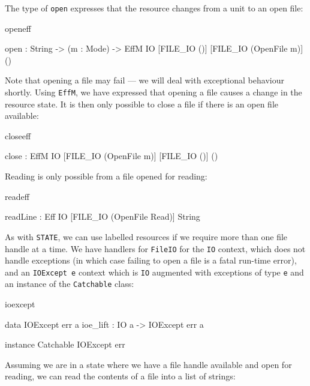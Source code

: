 \noindent
The type of \texttt{open} expresses that the resource changes from a unit
to an open file:

\begin{SaveVerbatim}{openeff}

open : String -> (m : Mode) -> 
       EffM IO [FILE_IO ()] [FILE_IO (OpenFile m)] ()

\end{SaveVerbatim}

\noindent
Note that opening a file may fail --- we will deal with exceptional behaviour
shortly. 
Using \texttt{EffM}, we have expressed that opening a file causes a change in the
resource state.
It is then only possible to close a file if there is an open file
available:

\begin{SaveVerbatim}{closeeff}

close : EffM IO [FILE_IO (OpenFile m)] [FILE_IO ()] ()

\end{SaveVerbatim}

\noindent
Reading is only possible from a file opened for reading:

\begin{SaveVerbatim}{readeff}

readLine : Eff IO [FILE_IO (OpenFile Read)] String

\end{SaveVerbatim}

\noindent
As with \texttt{STATE}, we can use labelled resources if we require more than
one file handle at a time. We have handlers for \texttt{FileIO} for the
\texttt{IO} context, which does not handle exceptions (in which case failing
to open a file is a fatal run-time error), and an \texttt{IOExcept e}
context which is \texttt{IO} augmented with exceptions of type \texttt{e}
and an instance of the \texttt{Catchable} class:

\begin{SaveVerbatim}{ioexcept}

data IOExcept err a
ioe_lift : IO a -> IOExcept err a

instance Catchable IOExcept err

\end{SaveVerbatim}

\noindent
Assuming we are in a state where we have a file handle available and open
for reading, we can read the contents of a file into a list of strings:

